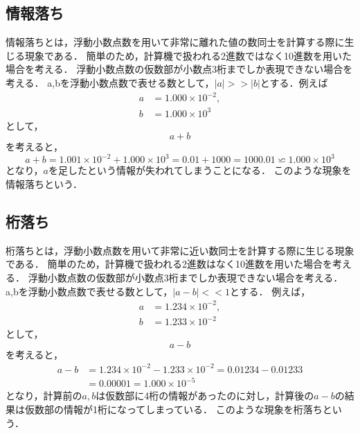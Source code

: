 \subsection{情報落ち}
情報落ちとは，浮動小数点数を用いて非常に離れた値の数同士を計算する際に生じる現象である．
簡単のため，計算機で扱われる2進数ではなく10進数を用いた場合を考える．
浮動小数点数の仮数部が小数点3桁までしか表現できない場合を考える．
a,bを浮動小数点数で表せる数として，$|a| >> |b|$とする．例えば
\begin{align*}
    a &= 1.000 \times 10^{-2}, \\
    b &= 1.000 \times 10^{3}
\end{align*}
として，
\begin{equation*}
    a + b
\end{equation*}
を考えると，
\begin{equation*}
    a + b = 1.001 \times 10^{-2} + 1.000 \times 10^{3} = 0.01 + 1000 = 1000.01 \backsimeq 1.000 \times 10^{3}
\end{equation*}
となり，$a$を足したという情報が失われてしまうことになる．
このような現象を情報落ちという．

\subsection{桁落ち}
桁落ちとは，浮動小数点数を用いて非常に近い数同士を計算する際に生じる現象である．
簡単のため，計算機で扱われる2進数はなく10進数を用いた場合を考える．
浮動小数点数の仮数部が小数点3桁までしか表現できない場合を考える．
a,bを浮動小数点数で表せる数として，$|a - b| << 1$とする．
例えば，
\begin{align*}
    a &= 1.234 \times 10^{-2}, \\
    b &= 1.233 \times 10^{-2}
\end{align*}
として，
\begin{equation*}
    a - b
\end{equation*}
を考えると，
\begin{align*}
    a - b &= 1.234 \times 10^{-2} - 1.233 \times 10^{-2} = 0.01234 - 0.01233 \\
    &= 0.00001 = 1.000 \times 10^{-5}
\end{align*}
となり，計算前の$a,b$は仮数部に4桁の情報があったのに対し，計算後の$a-b$の結果は仮数部の情報が1桁になってしまっている．
このような現象を桁落ちという．


